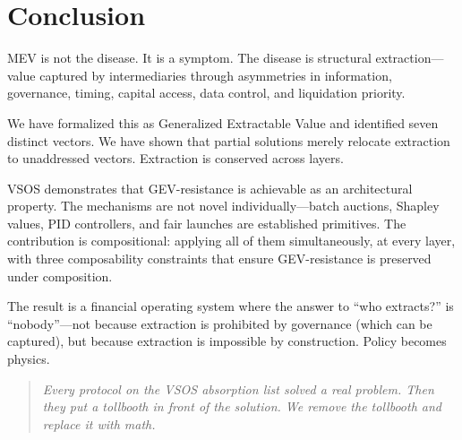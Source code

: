 \documentclass[11pt, a4paper]{article}
\begin{document}
\section{Conclusion}

MEV is not the disease. It is a symptom. The disease is structural extraction---value captured by intermediaries through asymmetries in information, governance, timing, capital access, data control, and liquidation priority.

We have formalized this as Generalized Extractable Value and identified seven distinct vectors. We have shown that partial solutions merely relocate extraction to unaddressed vectors. Extraction is conserved across layers.

VSOS demonstrates that GEV-resistance is achievable as an architectural property. The mechanisms are not novel individually---batch auctions, Shapley values, PID controllers, and fair launches are established primitives. The contribution is compositional: applying all of them simultaneously, at every layer, with three composability constraints that ensure GEV-resistance is preserved under composition.

The result is a financial operating system where the answer to ``who extracts?'' is ``nobody''---not because extraction is prohibited by governance (which can be captured), but because extraction is impossible by construction. Policy becomes physics.

\begin{quote}
\emph{Every protocol on the VSOS absorption list solved a real problem. Then they put a tollbooth in front of the solution. We remove the tollbooth and replace it with math.}
\end{quote}
\end{document}
